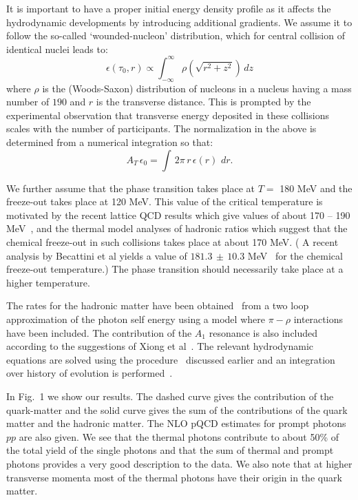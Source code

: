 It is important to have a proper initial energy density profile
as it affects the hydrodynamic developments by introducing additional gradients.
We assume it to follow the so-called
`wounded-nucleon' distribution, which for central collision of identical
nuclei leads to:
\begin{equation}
\epsilon(\tau_0,r)\propto \int_{-\infty}^\infty \rho(\sqrt{r^2+z^2})\, dz
\end{equation}
where $\rho$ is the (Woods-Saxon) distribution of nucleons in a nucleus
having  a mass number  of $190$
and $r$ is the transverse distance. This is prompted by
the experimental observation that transverse energy deposited in these
collisions scales with the number of participants.  The normalization in the
above is
determined from a numerical integration so that:
\begin{equation}
A_T \, \epsilon_0=\int \, 2\pi \, r \,  \epsilon(r) \,\,dr.
\end{equation}

We further assume that the phase transition takes place at $T=$ 180 MeV and the
freeze-out takes place at 120 MeV. This value of the critical temperature
is motivated by the recent lattice QCD results which give values of about 
170 -- 190 MeV~\cite{kars}, and the thermal model analyses of hadronic 
ratios which 
suggest that the chemical freeze-out in such collisions takes place
at about 170 MeV. ( A recent analysis by Becattini et al yields a value
 of $181.3\,\pm\,10.3$ MeV~\cite{johanna} for the chemical freeze-out
temperature.)
The phase transition should necessarily take place at a higher
temperature. 

The rates for the hadronic matter have been 
obtained~\cite{joe}
from a two loop approximation of the photon self energy 
using a model where $\pi-\rho$ interactions have been included. The 
contribution of the $A_1$ resonance is also included according to the
suggestions of Xiong et al~\cite{li}. The relevant hydrodynamic equations are
solved using the procedure~\cite{hydro} discussed earlier and
an integration over history of evolution is performed~\cite{crs}. 


In Fig.~1 we show our results.  The dashed curve gives the
contribution of the quark-matter and the solid curve gives the
sum of the contributions of the quark matter and the hadronic matter.
The NLO pQCD estimates for prompt photons $pp$ are also given.
 We see that the thermal photons  contribute to about 50\% of the total
yield of the single photons and that the sum of thermal and prompt 
photons provides a very good description to the data. We also note that
at higher transverse momenta most of the thermal photons have their
origin in the quark matter.

